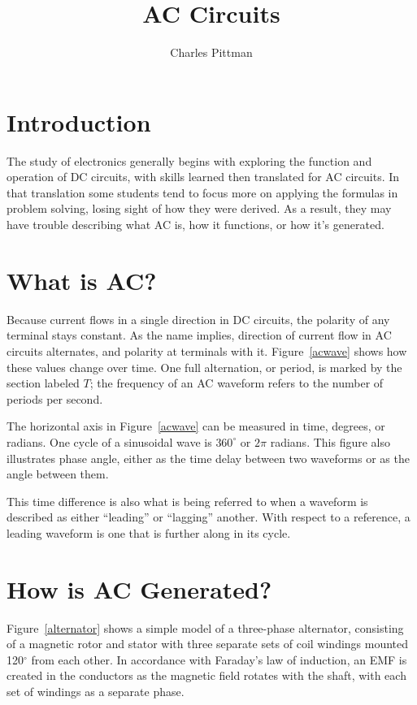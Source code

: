 \documentclass[12pt]{article}
\author{Charles Pittman}
\title{AC Circuits}
\begin{document}
\maketitle

\section*{Introduction}

The study of electronics generally begins with exploring the function and
operation of \ac{DC} circuits, with skills learned then translated for \ac{AC}
circuits.  In that translation some students tend to focus more on applying the
formulas in problem solving, losing sight of how they were derived.  As a
result, they may have trouble describing what \ac{AC} is, how it functions, or
how it's generated.

\section*{What is \ac{AC}?}

Because current flows in a single direction in \ac{DC} circuits, the polarity
of any terminal stays constant.  As the name implies, direction of current flow
in \ac{AC} circuits alternates, and polarity at terminals with it.
Figure~\ref{acwave} shows how these values change over time.  One full
alternation, or period, is marked by the section labeled $T$; the frequency of
an \ac{AC} waveform refers to the number of periods per second.

The horizontal axis in Figure~\ref{acwave} can be measured in time, degrees, or
radians.  One cycle of a sinusoidal wave is $360^\circ$ or $2\pi$ radians.
This figure also illustrates phase angle, either as the time delay between two
waveforms or as the angle between them.

This time difference is also what is being referred to when a waveform is
described as either ``leading'' or ``lagging'' another.  With respect to a
reference, a leading waveform is one that is further along in its cycle.

\section*{How is \ac{AC} Generated?}

Figure~\ref{alternator} shows a simple model of a three-phase alternator,
consisting of a magnetic rotor and stator with three separate sets of coil
windings mounted 120$^\circ$ from each other.  In accordance with Faraday's law
of induction, an \ac{EMF} is created in the conductors as the magnetic field
rotates with the shaft, with each set of windings as a separate phase.
\end{document}
